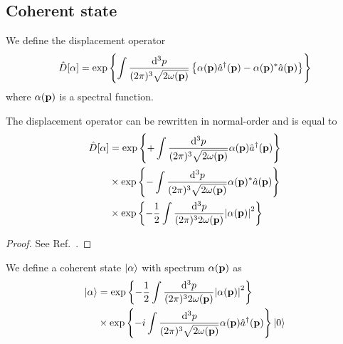 \subsection{Coherent state}

\begin{definition}
	We define the displacement operator
	\begin{equation}
		\hat{D}[\alpha]
		=
		\exp\left\{
			\int\frac{\dd[3]{p}}{(2\pi)^3\sqrt{2\omega(\vb{p})}}
			\left\{
				\alpha(\vb{p})
				\hat{a}^\dagger(\vb{p})
				-
				\alpha(\vb{p})^*
				\hat{a}(\vb{p})
			\right\}
		\right\}
		\label{eq:displacement_operator}
	\end{equation}
	where $\alpha(\vb{p})$ is a spectral function.
\end{definition}
\begin{lemma}
	The displacement operator can be rewritten in normal-order and is equal to
	\begin{equation}
		\begin{split}
			\hat{D}[\alpha]
			&=
			\exp\left\{
				+
				\int\frac{\dd[3]{p}}{(2\pi)^3\sqrt{2\omega(\vb{p})}}
				\alpha(\vb{p})
				\hat{a}^\dagger(\vb{p})
			\right\}
			\\
			&\times
			\exp\left\{
				-
				\int\frac{\dd[3]{p}}{(2\pi)^3\sqrt{2\omega(\vb{p})}}
				\alpha(\vb{p})^*
				\hat{a}(\vb{p})
			\right\}
			\\
			&\times
			\exp\left\{
				-
				\frac{1}{2}
				\int\frac{\dd[3]{p}}{(2\pi)^32\omega(\vb{p})}
				\abs{\alpha(\vb{p})}^2
			\right\}
		\end{split}
		\label{eq:displacement_operator_normal}
	\end{equation}
\end{lemma}
\begin{proof}
	See Ref.~\cite[p.~48]{Barnett2002}.
\end{proof}
\begin{definition}
	We define a coherent state $\ket{\alpha}$ with spectrum $\alpha(\vb{p})$ as
	\begin{equation}
		\begin{split}
			\ket{\alpha}
			&=
			\exp\left\{
				-
				\frac{1}{2}
				\int\frac{\dd[3]{p}}{(2\pi)^32\omega(\vb{p})}
				\abs{\alpha(\vb{p})}^2
			\right\}
			\\
			&\times
			\exp\left\{
				-i
				\int\frac{\dd[3]{p}}{(2\pi)^3\sqrt{2\omega(\vb{p})}}
				\alpha(\vb{p})
				\hat{a}^\dagger(\vb{p})
			\right\}
			\ket{0}
		\end{split}
	\end{equation}
\end{definition}
